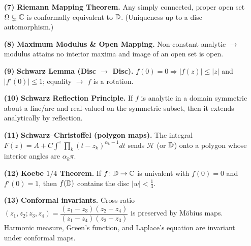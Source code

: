 \documentclass[12pt]{article}
\theoremstyle{definition} %
\theoremstyle{plain} %
\begin{document}
\begin{itemize}
 \item[\textbf{(7)}] \textbf{Riemann Mapping Theorem.}
       Any simply connected, proper open set
       \(\Omega\subsetneq\Bbb C\) is conformally equivalent to
       \(\Bbb D\).  (Uniqueness up to a disc automorphism.)
 
 \item[\textbf{(8)}] \textbf{Maximum Modulus \& Open Mapping.}
       Non-constant analytic $\to $  modulus attains no interior maxima and
       image of an open set is open.
 
 \item[\textbf{(9)}] \textbf{Schwarz Lemma (Disc $\to$ Disc).}
       \(f(0)=0\Rightarrow |f(z)|\le|z|\) and
       \(|f'(0)|\le 1\); equality $\to $  \(f\) is a rotation.
 
 \item[\textbf{(10)}] \textbf{Schwarz Reflection Principle.}
       If \(f\) is analytic in a domain symmetric about a line/arc and
       real-valued on the symmetric subset, then it extends
       analytically by reflection.
 
 \item[\textbf{(11)}] \textbf{Schwarz–Christoffel (polygon maps).}
       The integral
       \(
         F(z)=A + C\int^{z}\prod_{k}(t-z_{k})^{\alpha_{k}-1}dt
       \)
       sends \(\mathcal H\) (or \(\Bbb D\)) onto a polygon whose
       interior angles are \(\alpha_{k}\pi\).
 
 \item[\textbf{(12)}] \textbf{Koebe $1/4$ Theorem.}
       If \(f\colon\Bbb D\to\Bbb C\) is univalent with \(f(0)=0\) and
       \(f'(0)=1\), then \(f(\Bbb D)\) contains the disc
       \(|w|<\tfrac14\).
 
 \item[\textbf{(13)}] \textbf{Conformal invariants.}
       Cross-ratio
       \(
         (z_{1},z_{2};z_{3},z_{4})
         =
         \dfrac{(z_{1}-z_{3})(z_{2}-z_{4})}
               {(z_{1}-z_{4})(z_{2}-z_{3})}
       \)
       is preserved by Möbius maps.  
       Harmonic measure, Green’s function, and Laplace’s equation are
       invariant under conformal maps.
 

\end{itemize}
\end{document}
